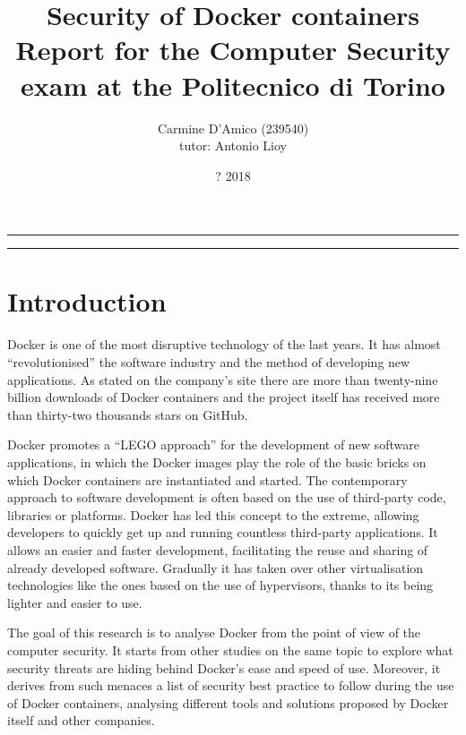 \documentclass[a4paper,12pt]{article}
\begin{document}
\title{Security of Docker containers \\
{\normalsize Report for the Computer Security exam at the Politecnico di Torino}
} \author{Carmine D'Amico (239540) \\
{\normalsize tutor: Antonio Lioy} }
\date{? 2018}
\maketitle

\vfill

\rule{\textwidth}{1pt}

\tableofcontents

\rule{\textwidth}{1pt}

\vfill

\newpage

\section{Introduction}

Docker is one of the most disruptive technology of the last years. It has almost
``revolutionised'' the software industry and the method of developing new
applications. As stated on the company's site \cite{docker_numbers} there are
more than twenty-nine billion downloads of Docker containers and the project
itself has received more than thirty-two thousands stars on GitHub. \par Docker
promotes a ``LEGO approach'' for the development of new software applications,
in which the Docker images play the role of the basic bricks on which Docker
containers are instantiated and started. The contemporary approach to software
development is often based on the use of third-party code, libraries or
platforms. Docker has led this concept to the extreme, allowing developers to
quickly get up and running countless third-party applications. It allows an
easier and faster development, facilitating the reuse and sharing of already
developed software. Gradually it has taken over other virtualisation
technologies like the ones based on the use of hypervisors, thanks to its being
lighter and easier to use. \par The goal of this research is to analyse Docker
from the point of view of the computer security. It starts from other studies on
the same topic to explore what security threats are hiding behind Docker's ease
and speed of use. Moreover, it derives from such menaces a list of security best
practice to follow during the use of Docker containers, analysing different
tools and solutions proposed by Docker itself and other companies. 
\end{document}
